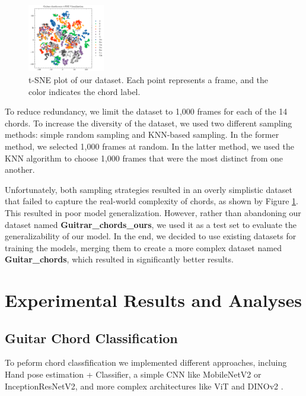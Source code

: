\documentclass[10pt,twocolumn,letterpaper]{article}
\begin{document}
\begin{figure}[h]
  \centering
  \includegraphics[width=0.3\textwidth]{images/final/Guitar-chords-ours_tsne_plot.png}
  \caption{t-SNE plot of our dataset. Each point represents a frame, and the color indicates the chord label. }
  \label{fig:ours-tsne-plot}
\end{figure}

To reduce redundancy, we limit the dataset to 1,000 frames for each of the 14 chords. To increase the diversity of the dataset, we used two different sampling methods: simple random sampling and KNN-based sampling. In the former method, we selected 1,000 frames at random. In the latter method, we used the KNN algorithm to choose 1,000 frames that were the most distinct from one another.

Unfortunately, both sampling strategies resulted in an overly simplistic dataset that failed to capture the real-world complexity of chords, as shown by Figure \ref{fig:ours-tsne-plot}. This resulted in poor model generalization. However, rather than abandoning our dataset named \textbf{Guitrar\_chords\_ours}, we used it as a test set to evaluate the generalizability of our model. In the end, we decided to use existing datasets \cite{guitar-chord-tvon8_dataset,guitar-chord-bounding-box_dataset, guitar-chord-handshape_dataset, guitar-chords-daewp_dataset} for training the models, merging them to create a more complex dataset named \textbf{Guitar\_chords}, which resulted in significantly better results.


\section{Experimental Results and Analyses}
\label{sec:results}

\subsection{Guitar Chord Classification}
To peform chord classfification we implemented different approaches, incluing Hand pose estimation + Classifier, a simple CNN like MobileNetV2 or InceptionResNetV2, and more complex architectures like ViT \cite{} and DINOv2 \cite{}.
\end{document}
